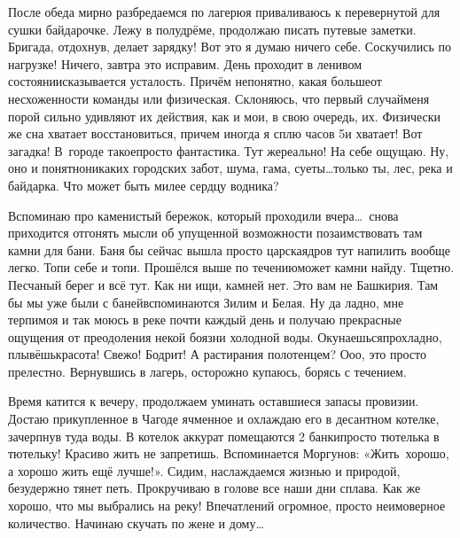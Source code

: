 После обеда мирно разбредаемся по лагерю\mdash я приваливаюсь к перевернутой для сушки байдарочке. Лежу в полудрёме, продолжаю писать путевые заметки. Бригада, отдохнув, делает зарядку! Вот это я думаю ничего себе. Соскучились по нагрузке! Ничего, завтра это исправим. День проходит в ленивом состоянии\mdash сказывается усталость. Причём непонятно, какая больше\mdash от несхоженности команды или физическая. Склоняюсь, что первый случай\mdash меня порой сильно удивляют их действия, как и мои, в свою очередь, их. Физически же сна хватает восстановиться, причем иногда я сплю часов 5\mdash и хватает! Вот загадка! В~городе такое\mdash просто фантастика. Тут же\mdash реально! На себе ощущаю. Ну, оно и понятно\mdash никаких городских забот, шума, гама, суеты\ldots только ты, лес, река и байдарка. Что может быть милее сердцу водника? 

Вспоминаю про каменистый бережок, который проходили вчера\ldots~снова приходится отгонять мысли об упущенной возможности позаимствовать там камни для бани. Баня бы сейчас вышла просто царская\mdash дров тут напилить вообще легко. Топи себе и топи. Прошёлся выше по течению\mdash может камни найду. Тщетно. Песчаный берег и всё тут. Как ни ищи, камней нет. Это вам не Башкирия. Там бы мы уже были с баней\mdash вспоминаются Зилим и Белая. Ну да ладно, мне терпимо\mdash я и так моюсь в реке почти каждый день и получаю прекрасные ощущения от преодоления некой боязни холодной воды. Окунаешься\mdash прохладно, плывёшь\mdash красота! Свежо! Бодрит! А растирания полотенцем? О\sdash о\sdash о, это просто прелестно. Вернувшись в лагерь, осторожно купаюсь, борясь с течением. 

Время катится к вечеру, продолжаем уминать оставшиеся запасы провизии. Достаю прикупленное в Чагоде ячменное и охлаждаю его в десантном котелке, зачерпнув туда воды. В котелок аккурат помещаются 2 банки\mdash просто тютелька в тютельку! Красиво жить не запретишь. Вспоминается Моргунов: «Жить~хорошо, а хорошо жить ещё лучше!». Сидим, наслаждаемся жизнью и природой, безудержно тянет петь. Прокручиваю в голове все наши дни сплава. Как же хорошо, что мы выбрались на реку! Впечатлений огромное, просто неимоверное количество. Начинаю скучать по жене и дому\ldots~

